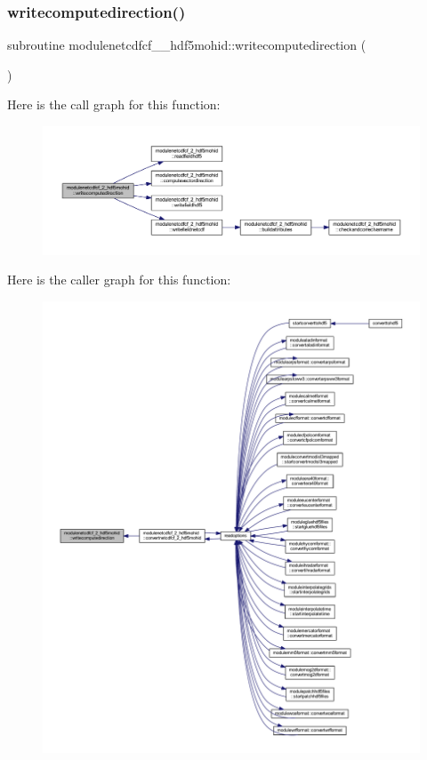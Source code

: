 \subsubsection{\texorpdfstring{writecomputedirection()}{writecomputedirection()}}
{\footnotesize\ttfamily subroutine modulenetcdfcf\+\_\+\_\+hdf5mohid\+::writecomputedirection (\begin{DoxyParamCaption}{ }\end{DoxyParamCaption})\hspace{0.3cm}{\ttfamily [private]}}

Here is the call graph for this function\+:\nopagebreak
\begin{figure}[H]
\begin{center}
\leavevmode
\includegraphics[width=350pt]{namespacemodulenetcdfcf__2__hdf5mohid_ae8ddd77f8739702fc89a6ced3c6794bc_cgraph}
\end{center}
\end{figure}
Here is the caller graph for this function\+:\nopagebreak
\begin{figure}[H]
\begin{center}
\leavevmode
\includegraphics[width=350pt]{namespacemodulenetcdfcf__2__hdf5mohid_ae8ddd77f8739702fc89a6ced3c6794bc_icgraph}
\end{center}
\end{figure}
